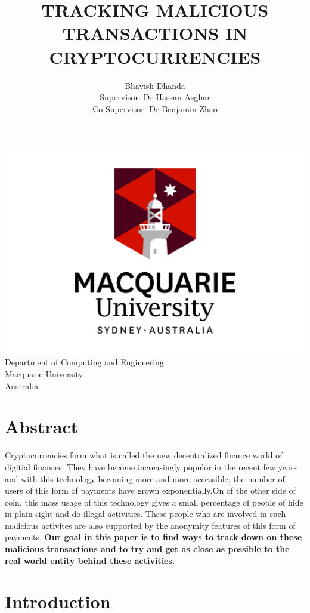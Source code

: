 \documentclass{article}
\begin{document}
\begin{titlepage}
\title{TRACKING MALICIOUS TRANSACTIONS IN CRYPTOCURRENCIES}
\author{Bhavish Dhanda {\\ Supervisor: Dr Hassan Asghar} {\\ Co-Supervisor: Dr Benjamin Zhao}}
\date{}
\end{titlepage}
\maketitle
\begin{center}
    \includegraphics[width=0.7\linewidth]{logo.jpg}\\[4ex]
    Department of Computing and Engineering\\
    Macquarie University\\
    Australia
\end{center}
\pagebreak
\tableofcontents
\pagebreak
\listoffigures
\lstlistoflistings
\pagebreak

\section{Abstract}
Cryptocurrencies form what is called the new decentralized finance world of digitial finances. They have become increasingly populor in the recent few years and with this technology becoming more and more accessible, the number of users of this form of payments have grown exponentially.On of the other side of coin, this mass usage of this technology gives a small percentage of people of hide in plain sight and do illegal activities. These people who are involved in such malicious activites are also supported by the anonymity features of this form of payments. \textbf{Our goal in this paper is to find ways to track down on these malicious transactions and to try and get as close as possible to the real world entity behind these activities.}
\pagebreak
\section{Introduction}
\pagebreak
\end{document}
